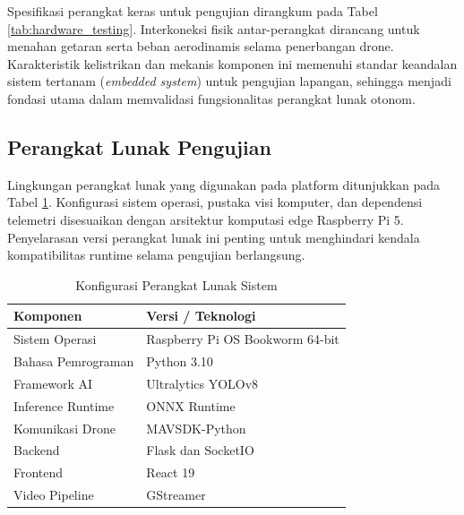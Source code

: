Spesifikasi perangkat keras untuk pengujian dirangkum pada Tabel \ref{tab:hardware_testing}. Interkoneksi fisik antar-perangkat dirancang untuk menahan getaran serta beban aerodinamis selama penerbangan drone. Karakteristik kelistrikan dan mekanis komponen ini memenuhi standar keandalan sistem tertanam (\textit{embedded system}) untuk pengujian lapangan, sehingga menjadi fondasi utama dalam memvalidasi fungsionalitas perangkat lunak otonom.

\subsection{Perangkat Lunak Pengujian}

Lingkungan perangkat lunak yang digunakan pada platform ditunjukkan pada Tabel \ref{tab:software_testing}. Konfigurasi sistem operasi, pustaka visi komputer, dan dependensi telemetri disesuaikan dengan arsitektur komputasi edge Raspberry Pi 5. Penyelarasan versi perangkat lunak ini penting untuk menghindari kendala kompatibilitas runtime selama pengujian berlangsung.

\begin{table}[H]
	\centering
	\caption{Konfigurasi Perangkat Lunak Sistem}
	\label{tab:software_testing}
	\renewcommand{\arraystretch}{1.2}
	\begin{tabular}{|p{5cm}|p{8cm}|}
		\hline
		Komponen & Versi / Teknologi \\ \hline
		
		Sistem Operasi &
		Raspberry Pi OS Bookworm 64-bit \\ \hline
		
		Bahasa Pemrograman &
		Python 3.10 \\ \hline
		
		Framework AI &
		Ultralytics YOLOv8 \\ \hline
		
		Inference Runtime &
		ONNX Runtime \\ \hline
		
		Komunikasi Drone &
		MAVSDK-Python \\ \hline
		
		Backend &
		Flask dan SocketIO \\ \hline
		
		Frontend &
		React 19 \\ \hline
		
		Video Pipeline &
		GStreamer \\ \hline
	\end{tabular}
\end{table}

